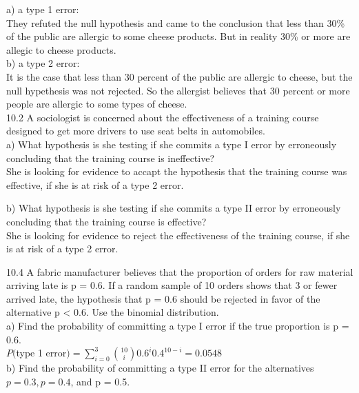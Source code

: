 a) a type 1 error: \\

They refuted the null hypothesis and came to the conclusion that less than 30\% of the public are allergic to some cheese products. But in reality 30\% or more are allegic to cheese products. \\

b) a type 2 error: \\

It is the case that less than 30 percent of the public are allergic to cheese, but the null hypethesis was not rejected. So the allergist believes that 30 percent or more people are allergic to some types of cheese. \\


10.2 A sociologist is concerned about the effectiveness of a training
course designed to get more drivers to use seat belts in
automobiles. \\

a) What hypothesis is she testing if she commits a
type I error by erroneously concluding that the
training course is ineffective? \\

She is looking for evidence to accapt the hypothesis that the training course was effective, if she is at risk of a type 2 error.

b) What hypothesis is she testing if she commits a
type II error by erroneously concluding that the
training course is effective? \\

She is looking for evidence to reject the effectiveness of the training course, if she is at risk of a type 2 error.

10.4 A fabric manufacturer believes that the proportion of orders for
raw material arriving late is p = 0.6. If a random sample of 10 orders
shows that 3 or fewer arrived late, the hypothesis that p = 0.6 should
be rejected in favor of the alternative p < 0.6. Use the binomial
distribution. \\

a) Find the probability of committing a type I error if the true proportion is p = 0.6. \\

$P($type 1 error$)$$= \sum^3_{i = 0} $${10} \choose {i}$$ 0.6^i 0.4 ^{10-i}$$=0.0548$ \\

b) Find the probability of committing a type II error for the alternatives $p = 0.3, p = 0.4$, and p = 0.5. \\

